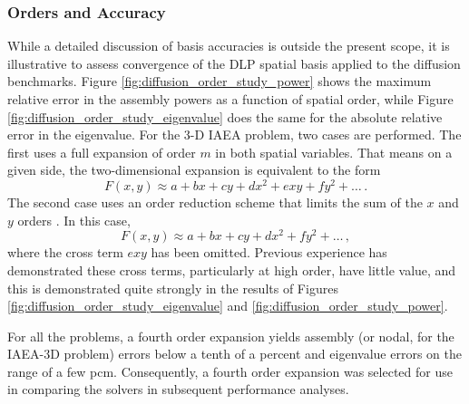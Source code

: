 \subsubsection{Orders and Accuracy}
\label{sec:diffusion_order_accuracy}

While a detailed discussion of basis accuracies is outside the 
present scope, it is illustrative to assess convergence 
of the DLP spatial basis applied to the diffusion benchmarks.  
Figure \ref{fig:diffusion_order_study_power}
 shows the maximum relative error in the assembly 
powers as a function of spatial order, while Figure 
\ref{fig:diffusion_order_study_eigenvalue} does 
the same for the absolute relative error in the eigenvalue.  For the 
3-D IAEA problem, two cases are performed.  The first uses a full 
expansion of order $m$ in both spatial variables.  That means on a given 
side, the two-dimensional expansion is equivalent to the form 
\begin{equation}
 F(x, y) \approx a + bx + cy + d x^2 + e xy + f y^2 + \ldots \, .
\end{equation}
The second case uses an order reduction scheme that 
limits the sum of the $x$ and $y$ orders \cite{forget2006tdh}.  In this case,
\begin{equation}
 F(x, y) \approx a + bx + cy + d x^2 + f y^2 + \ldots \, ,
\end{equation}
where the cross term $e xy$ has been omitted.  Previous experience 
has demonstrated these cross terms, particularly at high order, have 
little value, and this is demonstrated quite strongly in the results
of Figures \ref{fig:diffusion_order_study_eigenvalue} 
and \ref{fig:diffusion_order_study_power}.


For all the problems, a fourth order expansion yields assembly 
(or nodal, for the IAEA-3D problem) errors below a tenth of a percent 
and eigenvalue errors on the range of a few pcm.  Consequently, a fourth 
order expansion was selected for use in comparing the solvers in 
subsequent performance analyses.

% 


